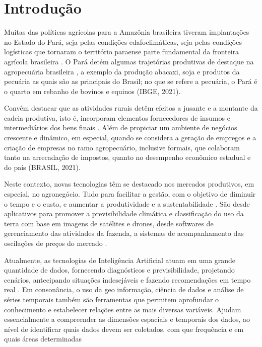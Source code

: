 
\section{Introdução}


Muitas das políticas agrícolas para a Amazônia brasileira tiveram implantações no Estado do Pará, seja pelas condições edafoclimáticas, seja pelas condições logísticas que tornaram o território paraense parte fundamental da fronteira agrícola brasileira \cite{maeda2009predicting}. O Pará detém algumas trajetórias produtivas de destaque na agropecuária brasileira \cite{pespectiva}, a exemplo da produção abacaxi, soja e produtos da pecuária as quais são as principais do Brasil; no que se refere a pecuária, o Pará é o quarto em rebanho de bovinos e equinos (IBGE, 2021).

Convêm destacar que as atividades rurais detêm efeitos a jusante e a montante da cadeia produtiva, isto é, incorporam elementos fornecedores de insumos e intermediários dos bens finais \cite{pinage2022forest}. Além de propiciar um ambiente de negócios crescente e dinâmico, em especial, quando se considera a geração de empregos e a criação de empresas no ramo agropecuário, inclusive formais, que colaboram tanto na arrecadação de impostos, quanto no desempenho econômico estadual e do país (BRASIL, 2021).

Neste contexto, novas tecnologias têm se destacado nos mercados produtivos, em especial, no agronegócio. Tudo para facilitar a gestão, com o objetivo de diminuir o tempo e o custo, e aumentar a produtividade e a sustentabilidade \cite{renzcherchen2021desenvolvimento}. São desde aplicativos para promover a previsibilidade climática e classificação do uso da terra com base em imagens de satélites e drones, desde softwares de gerenciamento das atividades da fazenda, a sistemas de acompanhamento das oscilações de preços do mercado \cite{gardon2020brazil}.

Atualmente, as tecnologias de Inteligência Artificial atuam em uma grande quantidade de dados, fornecendo diagnósticos e previsibilidade, projetando cenários, antecipando situações indesejáveis e fazendo recomendações em tempo real \cite{de2020mineraccao}. Em consonância, o uso da geo informação, ciência de dados e análise de séries temporais também são ferramentas que permitem aprofundar o conhecimento e estabelecer relações entre as mais diversas variáveis. Ajudam essencialmente a compreender as dimensões espaciais e temporais dos dados, ao nível de identificar quais dados devem ser coletados, com que frequência e em quais áreas determinadas

